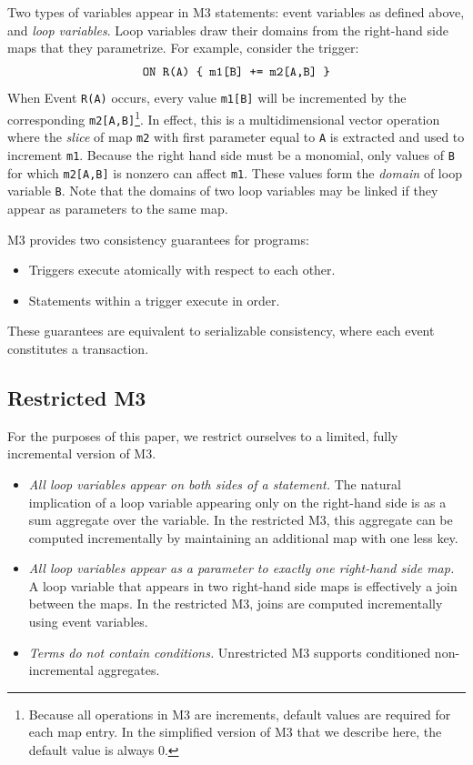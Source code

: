 \documentclass{vldb}
\begin{document}
Two types of variables appear in M3 statements: event variables as defined above, and \textit{loop variables}.  Loop variables draw their domains from the right-hand side maps that they parametrize.  For example, consider the trigger:
\[
\mbox{\texttt{ON R(A) \{ m1[B] += m2[A,B] \}}}
\]
When Event \texttt{R(A)} occurs, every value \texttt{m1[B]} will be incremented by the corresponding \texttt{m2[A,B]}\footnote{Because all operations in M3 are increments, default values are required for each map entry.  In the simplified version of M3 that we describe here, the default value is always 0.}.  In effect, this is a multidimensional vector operation where the \textit{slice} of map \texttt{m2} with first parameter equal to \texttt{A} is extracted and used to increment \texttt{m1}.  Because the right hand side must be a monomial, only values of \texttt{B} for which \texttt{m2[A,B]} is nonzero can affect \texttt{m1}.  These values form the \textit{domain} of loop variable \texttt{B}.  Note that the domains of two loop variables may be linked if they appear as parameters to the same map.


M3 provides two consistency guarantees for programs:
\begin{itemize}
\item Triggers execute atomically with respect to each other.
\item Statements within a trigger execute in order.
\end{itemize}
These guarantees are equivalent to serializable consistency, where each event constitutes a transaction.


\subsection{Restricted M3}

For the purposes of this paper, we restrict ourselves to a limited, fully incremental version of M3.  
\begin{itemize}
\item \textit{All loop variables appear on both sides of a statement.}  The natural implication of a loop variable appearing only on the right-hand side is as a sum aggregate over the variable.  In the restricted M3, this aggregate can be computed incrementally by maintaining an additional map with one less key.
\item \textit{All loop variables appear as a parameter to exactly one right-hand side map.}  A loop variable that appears in two right-hand side maps is effectively a join between the maps.  In the restricted M3, joins are computed incrementally using event variables.
\item \textit{Terms do not contain conditions.}  Unrestricted M3 supports conditioned non-incremental aggregates.
\end{itemize}
\end{document}
